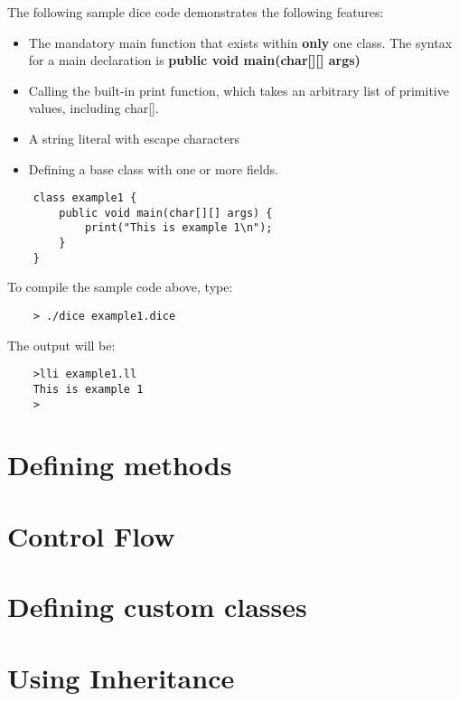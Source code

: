 \begin{homeworkProblem}
	The following sample dice code demonstrates the following features:
	\begin{itemize}
		\item The mandatory main function that exists within \textbf{only} one class. The syntax for a main declaration is \textbf{public void main(char[][] args)}
		\item Calling the built-in print function, which takes an arbitrary list of primitive values, including char[]. 
		\item A string literal with escape characters
		\item Defining a base class with one or more fields. 
	\end{itemize}
	\begin{verbatim}
	class example1 {
		public void main(char[][] args) {
			print("This is example 1\n");
		}
	}
	\end{verbatim}
	To compile the sample code above, type:
	\begin{verbatim}
	> ./dice example1.dice
	\end{verbatim}
	The output will be:
	\begin{verbatim}
	>lli example1.ll
	This is example 1
	>
	\end{verbatim}
	\section{Defining methods}
	\section{Control Flow}
	\section{Defining custom classes}
	\section{Using Inheritance}
\end{homeworkProblem}
